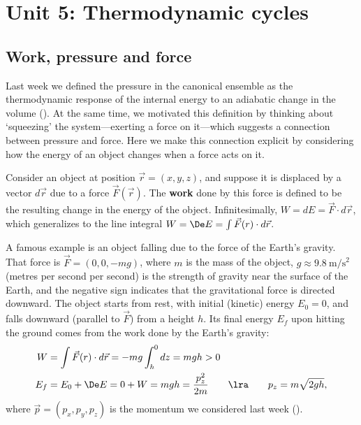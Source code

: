 \renewcommand{\thisunit}{MATH327 Unit 5}
\renewcommand{\moddate}{Last modified 17 Jan.~2022}
\setcounter{section}{5}
\setcounter{subsection}{0}
{}
\section*{Unit 5: Thermodynamic cycles}
\subsection{Work, pressure and force}
Last week we defined the pressure in the canonical ensemble as the thermodynamic response of the internal energy to an adiabatic change in the volume ().
At the same time, we motivated this definition by thinking about `squeezing' the system---exerting a force on it---which suggests a connection between pressure and force.
Here we make this connection explicit by considering how the energy of an object changes when a force acts on it.

\begin{shaded}
  Consider an object at position $\vec r = (x, y, z)$, and suppose it is displaced by a vector $d\vec r$ due to a force $\vec F(\vec r)$.
  The \textbf{work} done by this force is defined to be the resulting change in the energy of the object.
  Infinitesimally, $W = dE = \vec F\cdot d\vec r$, which generalizes to the line integral $W = \De E = \int \vec F(r)\cdot d\vec r$.
\end{shaded}

A famous example is an object falling due to the force of the Earth's gravity.
That force is $\vec F = (0, 0, -mg)$, where $m$ is the mass of the object, $g \approx 9.8~\mathrm{m}/\mathrm{s}^2$ (metres per second per second) is the strength of gravity near the surface of the Earth, and the negative sign indicates that the gravitational force is directed downward.
The object starts from rest, with initial (kinetic) energy $E_0 = 0$, and falls downward (parallel to $\vec F$) from a height $h$.
Its final energy $E_f$ upon hitting the ground comes from the work done by the Earth's gravity:
\begin{align*}
  W & = \int \vec F(r)\cdot d\vec r = -mg \int_h^0 dz = mgh > 0 \\
  E_f & = E_0 + \De E = 0 + W = mgh = \frac{p_z^2}{2m} \qquad \lra \qquad p_z = m\sqrt{2gh},
\end{align*}
where $\vec p = (p_x, p_y, p_z)$ is the momentum we considered last week ().

